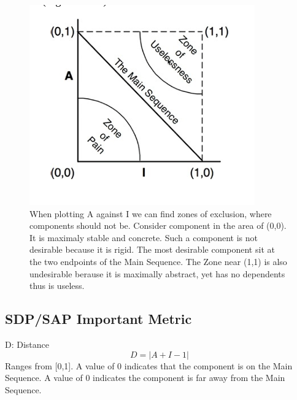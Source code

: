 \documentclass[../Main.tex]{subfiles}
\begin{document}
\begin{figure}[H]
    \centering
    \includegraphics[width=0.75\linewidth]{Images/cleanarch/stable-abstraction-principle.png}
    \caption{
        When plotting A against I we can find zones of exclusion, where components should not be.
        Consider component in the area of (0,0). It is maximaly stable and concrete.
        Such a component is not desirable because it is rigid. The most desirable component sit at the two endpoints of the Main Sequence.
        The Zone near (1,1) is also undesirable berause it is maximally abstract, yet has no dependents thus is useless.
    }
\end{figure}

\subsection{SDP/SAP Important Metric}
D: Distance
\begin{equation}
    D = |A+I-1|
\end{equation}
Ranges from [0,1]. A value of 0 indicates that the component is on the Main Sequence.
A value of 0 indicates the component is far away from the Main Sequence.
\end{document}
